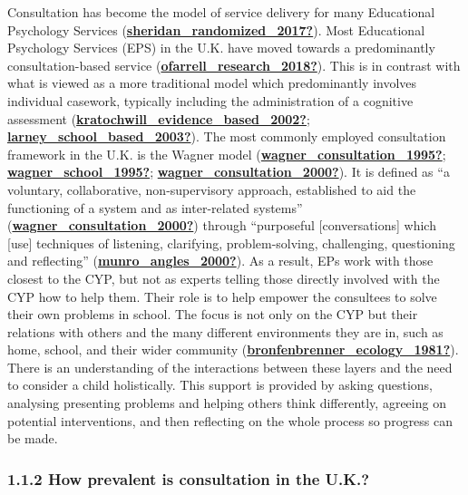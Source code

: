 \documentclass[
]{article}
\begin{document}
Consultation has become the model of service delivery for many
Educational Psychology Services
(\protect\hyperlink{ref-sheridan_randomized_2017}{\textbf{sheridan\_randomized\_2017?}}).
Most Educational Psychology Services (EPS) in the U.K. have moved
towards a predominantly consultation-based service
(\protect\hyperlink{ref-ofarrell_research_2018}{\textbf{ofarrell\_research\_2018?}}).
This is in contrast with what is viewed as a more traditional model
which predominantly involves individual casework, typically including
the administration of a cognitive assessment
(\protect\hyperlink{ref-kratochwill_evidence_based_2002}{\textbf{kratochwill\_evidence\_based\_2002?}};
\protect\hyperlink{ref-larney_school_based_2003}{\textbf{larney\_school\_based\_2003?}}).
The most commonly employed consultation framework in the U.K. is the
Wagner model
(\protect\hyperlink{ref-wagner_consultation_1995}{\textbf{wagner\_consultation\_1995?}};
\protect\hyperlink{ref-wagner_school_1995}{\textbf{wagner\_school\_1995?}};
\protect\hyperlink{ref-wagner_consultation_2000}{\textbf{wagner\_consultation\_2000?}}).
It is defined as ``a voluntary, collaborative, non-supervisory approach,
established to aid the functioning of a system and as inter-related
systems''
(\protect\hyperlink{ref-wagner_consultation_2000}{\textbf{wagner\_consultation\_2000?}})
through ``purposeful {[}conversations{]} which {[}use{]} techniques of
listening, clarifying, problem-solving, challenging, questioning and
reflecting''
(\protect\hyperlink{ref-munro_angles_2000}{\textbf{munro\_angles\_2000?}}).
As a result, EPs work with those closest to the CYP, but not as experts
telling those directly involved with the CYP how to help them. Their
role is to help empower the consultees to solve their own problems in
school. The focus is not only on the CYP but their relations with others
and the many different environments they are in, such as home, school,
and their wider community
(\protect\hyperlink{ref-bronfenbrenner_ecology_1981}{\textbf{bronfenbrenner\_ecology\_1981?}}).
There is an understanding of the interactions between these layers and
the need to consider a child holistically. This support is provided by
asking questions, analysing presenting problems and helping others think
differently, agreeing on potential interventions, and then reflecting on
the whole process so progress can be made.

\hypertarget{how-prevalent-is-consultation-in-the-u.k.}{%
\subsubsection{1.1.2 How prevalent is consultation in the
U.K.?}\label{how-prevalent-is-consultation-in-the-u.k.}}
\end{document}
